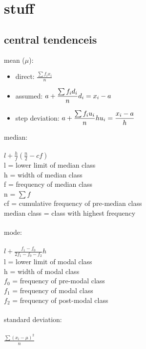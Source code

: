 \documentclass[12pt]{article}
\begin{document}
\section{stuff}
\subsection{central tendenceis}
{\large mean ($\mu$):}
\begin{itemize}
  \item direct: $\displaystyle \frac{\sum{f_ix_i}}{n}$
  \item assumed: $\displaystyle a + \frac{\sum{f_id_i}}{n} \\ d_i = x_i - a $
  \item step deviation: $\displaystyle a + \frac{\sum{f_iu_i}}{n}h \\ u_i = \frac{x_i - a}{h} $
\end{itemize}
\vspace*{1\baselineskip}
{\large median: \\ } \\
$\displaystyle l + \frac{h}{f}(\frac{n}{2}-cf) $ \\
l = lower limit of median class \\
h = width of median class \\
f = frequency of median class \\
n = $\sum{f}$ \\
cf = cumulative frequency of pre-median class \\
median class = class with highest frequency \\
\vspace*{1\baselineskip} \\
{\large mode: \\ } \\
$\displaystyle l + \frac{f_1 - f_0}{2f_1 - f_0 - f_2}h $ \\
l = lower limit of modal class \\
h = width of modal class \\
$f_0$ = frequency of pre-modal class \\
$f_1$ = frequency of modal class \\
$f_2$ = frequency of post-modal class \\
\vspace*{1\baselineskip} \\
{\large standard deviation: \\ } \\
$\displaystyle \frac{\sum{(x_i - \mu)^2}}{n}$
\vspace*{1\baselineskip} \\
\end{document}
